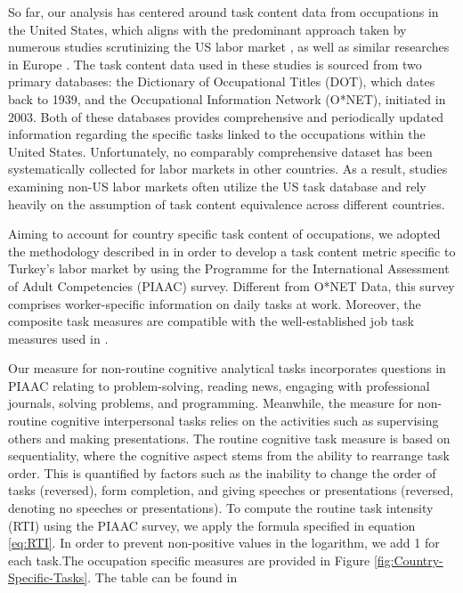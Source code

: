 \begin{onehalfspace}
So far, our analysis has centered around task content data from occupations
in the United States, which aligns with the predominant approach taken
by numerous studies scrutinizing the US labor market \citep{2003Autor,2006Autor,2006SpitzOener,Acemoglu2011,2013Autor,2011Firpo},
as well as similar researches in Europe \citep{2007Goos,2009Goos,2014Goos,2018Hardy,2016Hardy,2018Fonseca,Aedo2013}.
The task content data used in these studies is sourced from two primary
databases: the Dictionary of Occupational Titles (DOT), which dates
back to 1939, and the Occupational Information Network (O{*}NET),
initiated in 2003. Both of these databases provides comprehensive
and periodically updated information regarding the specific tasks
linked to the occupations within the United States. Unfortunately,
no comparably comprehensive dataset has been systematically collected
for labor markets in other countries. As a result, studies examining
non-US labor markets often utilize the US task database and rely heavily
on the assumption of task content equivalence across different countries.

Aiming to account for country specific task content of occupations,
we adopted the methodology described in \citet{lewandowski2022,2020Rica}
in order to develop a task content metric specific to Turkey's labor
market by using the Programme for the International Assessment of
Adult Competencies (PIAAC) survey. Different from O{*}NET Data, this
survey comprises worker-specific information on daily tasks at work.
Moreover, the composite task measures are compatible with the well-established
job task measures used in \citet{Acemoglu2011}.

Our measure for non-routine cognitive analytical tasks incorporates
questions in PIAAC relating to problem-solving, reading news, engaging
with professional journals, solving problems, and programming. Meanwhile,
the measure for non-routine cognitive interpersonal tasks relies on
the activities such as supervising others and making presentations.
The routine cognitive task measure is based on sequentiality, where
the cognitive aspect stems from the ability to rearrange task order.
This is quantified by factors such as the inability to change the
order of tasks (reversed), form completion, and giving speeches or
presentations (reversed, denoting no speeches or presentations). To
compute the routine task intensity (RTI) using the PIAAC survey, we
apply the formula specified in equation \ref{eq:RTI}. In order to
prevent non-positive values in the logarithm, we add 1 for each task.The
occupation specific measures are provided in Figure \ref{fig:Country-Specific-Tasks}.
The table can be found in 


\end{onehalfspace}
